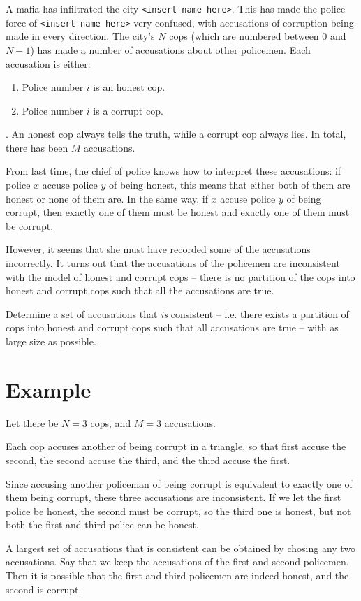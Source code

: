 \newcommand\version{v1}
A mafia has infiltrated the city \texttt{<insert name here>}.
This has made the police force of \texttt{<insert name here>} very confused, with accusations of corruption being made in every direction.
The city's $N$ cops (which are numbered between $0$ and $N - 1$) has made a number of accusations about other policemen.
Each accusation is either:
\begin{enumerate}
  \item Police number $i$ is an honest cop.
  \item Police number $i$ is a corrupt cop.
\end{enumerate}.
An honest cop always tells the truth, while a corrupt cop always lies.
In total, there has been $M$ accusations.

From last time, the chief of police knows how to interpret these accusations: if police $x$ accuse police $y$ of being honest,
this means that either both of them are honest or none of them are. In the same way, if $x$ accuse police $y$ of being corrupt,
then exactly one of them must be honest and exactly one of them must be corrupt.

However, it seems that she must have recorded some of the accusations incorrectly. It turns out that the accusations of the 
policemen are inconsistent with the model of honest and corrupt cops -- there is no partition of the cops into honest
and corrupt cops such that all the accusations are true.

Determine a set of accusations that \emph{is} consistent -- i.e. there exists a partition of cops into honest and corrupt cops
such that all accusations are true -- with as large size as possible.

\section*{Example}
Let there be $N = 3$ cops, and $M = 3$ accusations.

Each cop accuses another of being corrupt in a triangle, so that first accuse the second, the second accuse the third, and the third
accuse the first.

Since accusing another policeman of being corrupt is equivalent to exactly one of them being corrupt, these three accusations
are inconsistent. If we let the first police be honest, the second must be corrupt, so the third one is honest, but not both
the first and third police can be honest.

A largest set of accusations that is consistent can be obtained by chosing any two accusations. Say that we keep the accusations
of the first and second policemen. Then it is possible that the first and third policemen are indeed honest, and the second
is corrupt.

